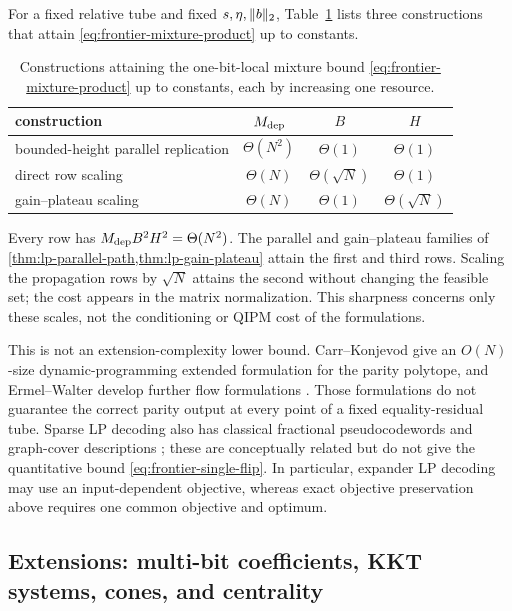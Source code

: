 For a fixed relative tube and fixed \(s,\eta,\lVert b\rVert_2\),
Table~\ref{tab:frontier-currencies} lists three constructions that attain
\eqref{eq:frontier-mixture-product} up to constants.
\begin{table}[t]
 \centering
 \small
 \caption{Constructions attaining the one-bit-local mixture bound
 \eqref{eq:frontier-mixture-product} up to constants, each by increasing one
 resource.}
 \label{tab:frontier-currencies}
 \begin{tabular}{@{}lccc@{}}
  \toprule
  construction & \(M_{\rm dep}\) & \(B\) & \(H\) \\
  \midrule
  bounded-height parallel replication
    & \(\Theta(N^2)\) & \(\Theta(1)\) & \(\Theta(1)\) \\
  direct row scaling
    & \(\Theta(N)\) & \(\Theta(\sqrt N)\) & \(\Theta(1)\) \\
  gain--plateau scaling
    & \(\Theta(N)\) & \(\Theta(1)\) & \(\Theta(\sqrt N)\) \\
  \bottomrule
 \end{tabular}
\end{table}
Every row has \(M_{\rm dep}B^2H^2=\Theta(N^2)\).  The parallel and
gain--plateau families of
\cref{thm:lp-parallel-path,thm:lp-gain-plateau} attain the
first and third rows.  Scaling the propagation rows by \(\sqrt N\)
attains the second without changing the feasible set; the cost appears in
the matrix normalization.  This sharpness concerns only these scales, not
the conditioning or QIPM cost of the formulations.

This is not an extension-complexity lower bound.  Carr--Konjevod give an
\(O(N)\)-size dynamic-programming extended formulation for the parity
polytope, and Ermel--Walter develop further flow formulations
\cite{carr2005-polyhedral-combinatorics,ermel2018-parity-polytopes-and-binarization}.
Those formulations do not guarantee the correct parity output at every point
of a fixed equality-residual tube.  Sparse LP decoding also has classical
fractional pseudocodewords and graph-cover descriptions
\cite{feldman2005-using-linear-programming-to-decode,
koetter2005-characterizations-of-pseudo-codewords-of,
vontobel2005-graph-cover-decoding}; these are conceptually related but do
not give the quantitative bound \eqref{eq:frontier-single-flip}.  In
particular, expander LP decoding may use an input-dependent objective,
whereas exact objective preservation above requires one common objective
and optimum.

\subsection{Extensions: multi-bit coefficients, KKT systems, cones, and centrality}
\label{sec:frontier-mixture-supplements}

